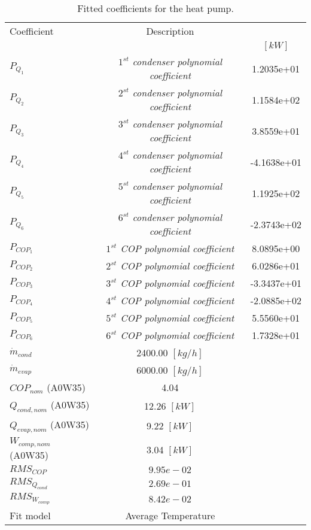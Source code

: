 \documentclass[english]{SPFShortReport}
\author{Dani Carbonell}
\begin{document}
\begin{table}[!ht]
\begin{small}
\caption{Fitted coefficients for the heat pump.}
\begin{center}
\resizebox{12cm}{!} 
{
\begin{tabular}{l | c c } 
\hline
\hline
Coefficient &Description & \\ 
 & &$[kW]$\\ 
\hline
$P_{Q_{1}}$ & \emph{$1^{st}$ condenser polynomial coefficient}  & 1.2035e+01    \\ 
$P_{Q_{2}}$ & \emph{$2^{st}$ condenser polynomial coefficient}  & 1.1584e+02    \\ 
$P_{Q_{3}}$ & \emph{$3^{st}$ condenser polynomial coefficient}  & 3.8559e+01    \\ 
$P_{Q_{4}}$ & \emph{$4^{st}$ condenser polynomial coefficient}  & -4.1638e+01    \\ 
$P_{Q_{5}}$ & \emph{$5^{st}$ condenser polynomial coefficient}  & 1.1925e+02    \\ 
$P_{Q_{6}}$ & \emph{$6^{st}$ condenser polynomial coefficient}  & -2.3743e+02    \\ 
\hline
$P_{COP_{1}}$ & \emph{$1^{st}$ COP polynomial coefficient}  & 8.0895e+00    \\ 
$P_{COP_{2}}$ & \emph{$2^{st}$ COP polynomial coefficient}  & 6.0286e+01    \\ 
$P_{COP_{3}}$ & \emph{$3^{st}$ COP polynomial coefficient}  & -3.3437e+01    \\ 
$P_{COP_{4}}$ & \emph{$4^{st}$ COP polynomial coefficient}  & -2.0885e+02    \\ 
$P_{COP_{5}}$ & \emph{$5^{st}$ COP polynomial coefficient}  & 5.5560e+01    \\ 
$P_{COP_{6}}$ & \emph{$6^{st}$ COP polynomial coefficient}  & 1.7328e+01    \\ 
\hline
$\dot m_{cond}$ & 2400.00 $[kg/h]$ \\ 
$\dot m_{evap}$ & 6000.00 $[kg/h]$ \\ 
\hline
$COP_{nom}$ (A0W35)& 4.04 \\ 
$Q_{cond,nom}$ (A0W35)& 12.26 $[kW]$\\ 
$Q_{evap,nom}$ (A0W35)& 9.22 $[kW]$\\ 
$W_{comp,nom}$ (A0W35)& 3.04 $[kW]$\\ 
\hline
 $RMS_{COP}$ & $9.95e-02$ \\ 
 $RMS_{Q_{cond}}$ & $2.69e-01$ \\ 
 $RMS_{W_{comp}}$ & $8.42e-02$ \\ 
\hline
Fit model & Average Temperature\\ 
\hline
\hline
\end{tabular}
}
\label{CoefTable}
\end{center}
\end{small}
\end{table}
\end{document}
